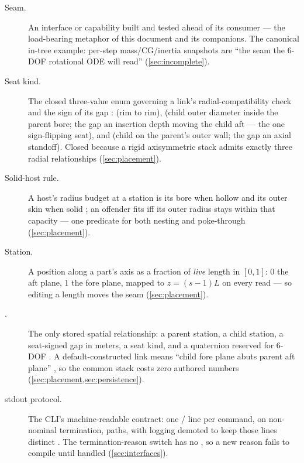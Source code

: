 \begin{description}
\item[Seam.] An interface or capability built and tested ahead of its consumer --- the
  load-bearing metaphor of this document and its companions. The canonical in-tree example:
  per-step mass/CG/inertia snapshots are ``the seam the 6-DOF rotational ODE will read''
   (\cref{sec:incomplete}).

\item[Seat kind.] The closed three-value enum governing a link's radial-compatibility
  check and the sign of its gap :  (rim to
  rim),  (child outer diameter inside the parent bore; the gap an
  insertion depth moving the child aft --- the one sign-flipping seat), and
   (child on the parent's outer wall; the gap an axial standoff). Closed
  because a rigid axisymmetric stack admits exactly three radial relationships
  (\cref{sec:placement}).

\item[Solid-host rule.] A host's radius budget at a station is its bore when hollow and
  its outer skin when solid ; an offender fits iff its outer
  radius stays within that capacity --- one predicate for both nesting and poke-through
  (\cref{sec:placement}).

\item[Station.] A position along a part's axis as a fraction of \emph{live} length in
  $[0,1]$: 0 the aft plane, 1 the fore plane, mapped to $z = (s-1)L$ on every read
   --- so editing a length moves the seam
  (\cref{sec:placement}).

\item[.] The only stored spatial relationship: a parent station, a child
  station, a seat-signed gap in meters, a seat kind, and a quaternion reserved for 6-DOF
  . A default-constructed link means ``child fore plane
  abuts parent aft plane'' , so the common stack costs
  zero authored numbers (\cref{sec:placement,sec:persistence}).

\item[stdout protocol.] The CLI's machine-readable contract: one / line
  per command,  on non-nominal termination,  paths, with logging
  demoted to keep those lines distinct . The termination-reason
  switch has no , so a new reason fails to compile until handled
   (\cref{sec:interfaces}).


\end{description}
